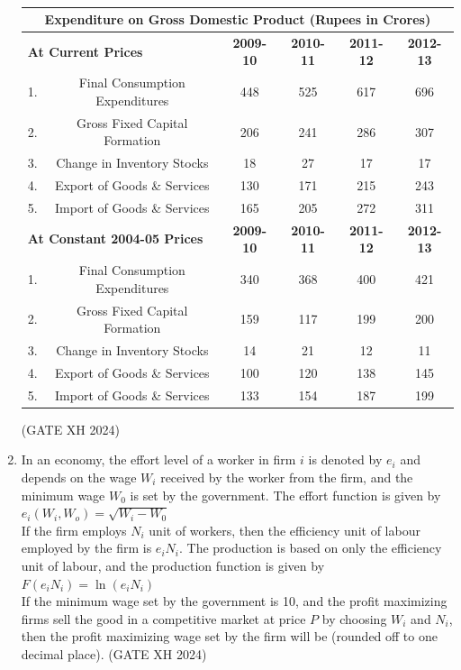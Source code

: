 \documentclass{article}
\begin{document}
\begin{enumerate}
    \begin{table}[ht]
    \centering 
    \begin{tabular}{|c|c|c|c|c|c|}
    \hline
    \multicolumn{6}{|c|}{\textbf{Expenditure on Gross Domestic Product (Rupees in Crores)}} \\
    \hline
    \multicolumn{2}{|l|}{\textbf{At Current Prices}} & \textbf{2009-10} & \textbf{2010-11} & \textbf{2011-12} & \textbf{2012-13} \\ \hline
    1. & Final Consumption Expenditures        & 448 & 525 & 617 & 696 \\ \hline
    2. & Gross Fixed Capital Formation         & 206 & 241 & 286 & 307 \\ \hline
    3. & Change in Inventory Stocks            & 18  & 27  & 17  & 17  \\ \hline
    4. & Export of Goods \& Services           & 130 & 171 & 215 & 243 \\ \hline
    5. & Import of Goods \& Services           & 165 & 205 & 272 & 311 \\ \hline
    \multicolumn{2}{|l|}{\textbf{At Constant 2004-05 Prices}} & \textbf{2009-10} & \textbf{2010-11} & \textbf{2011-12} & \textbf{2012-13} \\ \hline
    1. & Final Consumption Expenditures        & 340 & 368 & 400 & 421 \\ \hline
    2. & Gross Fixed Capital Formation         & 159 & 117 & 199 & 200 \\ \hline
    3. & Change in Inventory Stocks            & 14  & 21  & 12  & 11  \\ \hline
    4. & Export of Goods \& Services           & 100 & 120 & 138 & 145 \\ \hline
    5. & Import of Goods \& Services           & 133 & 154 & 187 & 199 \\ \hline
    \end{tabular}
    \caption{}
    \end{table}  \hfill (GATE XH 2024)

    \item In an economy, the effort level of a worker in firm $i$ is denoted by $e_i$ and depends on the wage $W_i$ received by the worker from the firm, and the minimum wage $W_0$ is set by the government. The effort function is given by \\ $e_i(W_i,W_o)=\sqrt{W_i-W_0}$ \\ If the firm employs $N_i$ unit of workers, then the efficiency unit of labour employed by the firm is $e_iN_i$. The production is based on only the efficiency unit of labour, and the production function is given by \\ $F(e_iN_i)=\ln(e_iN_i)$ \\ If the minimum wage set by the government is 10, and the profit maximizing firms sell the good in a competitive market at price $P$ by choosing $W_i$ and $N_i$, then the profit maximizing wage set by the firm will be \makebox[1cm]{\hrulefill} (rounded off to one decimal place). \hfill (GATE XH 2024)


\end{enumerate}
\end{document}

